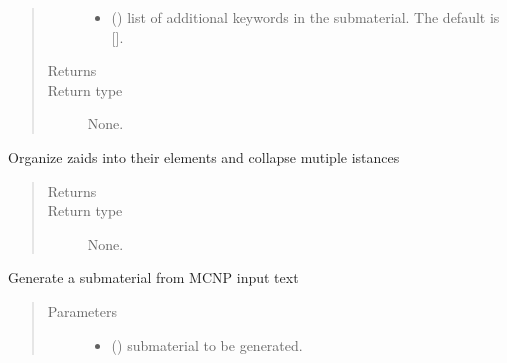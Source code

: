 \documentclass[letterpaper,10pt,english]{sphinxmanual}
\begin{document}
\begin{fulllineitems}
\begin{quote}
\begin{description}
\begin{itemize}
\item {} 
\sphinxAtStartPar
{} (\sphinxstyleliteralemphasis{\sphinxupquote{{[}}}\sphinxstyleliteralemphasis{\sphinxupquote{{]}}}\sphinxstyleliteralemphasis{\sphinxupquote{, }}) \textendash{} list of additional keywords in the submaterial. The default is {[}{]}.

\end{itemize}

\item[{Returns}] \leavevmode
\sphinxAtStartPar


\item[{Return type}] \leavevmode
\sphinxAtStartPar
None.

\end{description}\end{quote}

\begin{fulllineitems}
\label{\detokenize{api/inputgeneration:matreader.SubMaterial.collapse_zaids}}
\sphinxAtStartPar
Organize zaids into their elements and collapse mutiple istances
\begin{quote}\begin{description}
\item[{Returns}] \leavevmode
\sphinxAtStartPar


\item[{Return type}] \leavevmode
\sphinxAtStartPar
None.

\end{description}\end{quote}

\end{fulllineitems}


\begin{fulllineitems}
\label{\detokenize{api/inputgeneration:matreader.SubMaterial.from_text}}
\sphinxAtStartPar
Generate a submaterial from MCNP input text
\begin{quote}\begin{description}
\item[{Parameters}] \leavevmode\begin{itemize}
\item {} 
\sphinxAtStartPar
{} ({\hyperref[\detokenize{api/inputgeneration:matreader.SubMaterial}]{}}) \textendash{} submaterial to be generated.


\end{itemize}
\end{description}
\end{quote}
\end{fulllineitems}
\end{fulllineitems}
\end{document}
